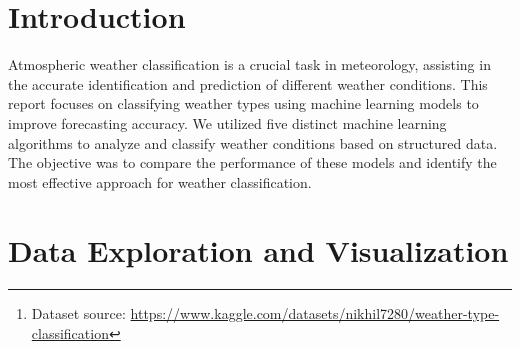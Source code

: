 \documentclass{article}
\begin{document}
\begin{abstract}
This report presents a machine learning approach to atmospheric weather classification using the "Weather Type Classification" dataset from Kaggle\footnote{Dataset source: \url{https://www.kaggle.com/datasets/nikhil7280/weather-type-classification}}. The dataset consists of a CSV file containing weather-related features and corresponding weather labels. We applied five different machine learning models to classify weather conditions, comparing their performance to identify the most effective model. Since the dataset is clean with no missing values and all features are in appropriate formats, minimal preprocessing was required. The dataset was divided into training, validation, and testing subsets to ensure robust performance evaluation across unseen data.
\end{abstract}

\section{Introduction}

Atmospheric weather classification is a crucial task in meteorology, assisting in the accurate identification and prediction of different weather conditions. This report focuses on classifying weather types using machine learning models to improve forecasting accuracy. We utilized five distinct machine learning algorithms to analyze and classify weather conditions based on structured data. The objective was to compare the performance of these models and identify the most effective approach for weather classification.

\section{Data Exploration and Visualization}
\end{document}
